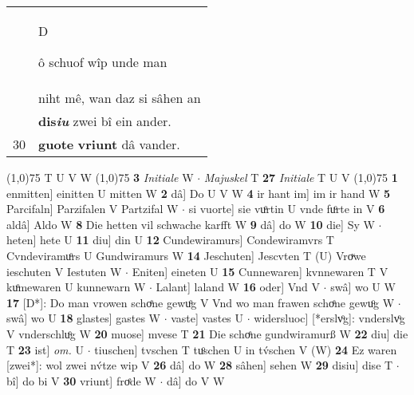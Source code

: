 \documentclass[8pt,a4paper,notitlepage]{article}
\begin{document}
\begin{table}[ht]
\begin{minipage}[t]{0.5\linewidth}
\begin{tabular}{rl}
 & \begin{large}D\end{large}ô schuof wîp unde man\\ 
 & niht mê, wan daz si sâhen an\\ 
 & \textbf{dis\textit{iu}} zwei bî ein ander.\\ 
30 & \textbf{guote} \textbf{vriunt} dâ vander.\\ 
\end{tabular}
\scriptsize
\line(1,0){75} \newline
T U V W \newline
\line(1,0){75} \newline
\textbf{3} \textit{Initiale} W   $\cdot$ \textit{Majuskel} T  \textbf{27} \textit{Initiale} T U V  \newline
\line(1,0){75} \newline
\textbf{1} enmitten] einitten U mitten W \textbf{2} dâ] Do U V W \textbf{4} ir hant im] im ir hand W \textbf{5} Parcifaln] Parzifalen V Partzifal W  $\cdot$ si vuorte] sie vuͦrtin U vnde fuͦrte in V \textbf{6} aldâ] Aldo W \textbf{8} Die hetten vil schwache karfft W \textbf{9} dâ] do W \textbf{10} die] Sy W  $\cdot$ heten] hete U \textbf{11} diu] din U \textbf{12} Cundewiramurs] Condewiramvrs T Cvndeviramuͦrs U Gundwiramurs W \textbf{14} Jeschuten] Jescvten T (U) Vroͮwe ieschuten V Iestuten W  $\cdot$ Eniten] eineten U \textbf{15} Cunnewaren] kvnnewaren T V kuͦmewaren U kunnewarn W  $\cdot$ Lalant] laland W \textbf{16} oder] Vnd V  $\cdot$ swâ] wo U W \textbf{17} [D*]: Do man vrowen schoͤne gewuͦg V Vnd wo man frawen schoͤne gewuͦg W  $\cdot$ swâ] wo U \textbf{18} glastes] gastes W  $\cdot$ vaste] vastes U  $\cdot$ widersluoc] [*erslvͦg]: vnderslvͦg V vnderschluͦg W \textbf{20} muose] mvese T \textbf{21} Die schoͤne gundwiramurß W \textbf{22} diu] die T \textbf{23} ist] \textit{om.} U  $\cdot$ tiuschen] tvschen T tuͦschen U in tv́schen V (W) \textbf{24} Ez waren [zwei*]: wol zwei nv́tze wip V \textbf{26} dâ] do W \textbf{28} sâhen] sehen W \textbf{29} disiu] dise T  $\cdot$ bî] do bi V \textbf{30} vriunt] froͤde W  $\cdot$ dâ] do V W \newline
\end{minipage}
\end{table}
\end{document}
